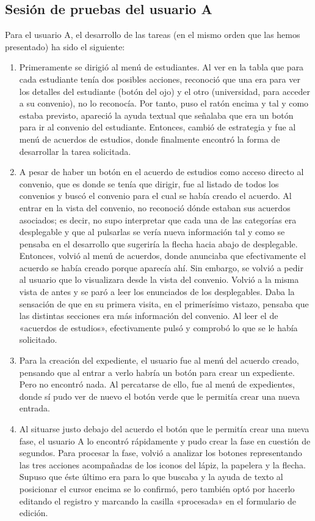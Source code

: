 \subsection{Sesión de pruebas del usuario A}

Para el usuario A, el desarrollo de las tareas (en el mismo orden que las hemos presentado) ha sido el siguiente:

\begin{enumerate}
	\item Primeramente se dirigió al menú de estudiantes. Al ver en la tabla que para cada estudiante tenía dos posibles acciones, reconoció que una era para ver los detalles del estudiante (botón del ojo) y el otro (universidad, para acceder a su convenio), no lo reconocía. Por tanto, puso el ratón encima y tal y como estaba previsto, apareció la ayuda textual que señalaba que era un botón para ir al convenio del estudiante. Entonces, cambió de estrategia y fue al menú de acuerdos de estudios, donde finalmente encontró la forma de desarrollar la tarea solicitada.
	\item A pesar de haber un botón en el acuerdo de estudios como acceso directo al convenio, que es donde se tenía que dirigir, fue al listado de todos los convenios y buscó el convenio para el cual se había creado el acuerdo. Al entrar en la vista del convenio, no reconoció dónde estaban sus acuerdos asociados; es decir, no supo interpretar que cada una de las categorías era desplegable y que al pulsarlas se vería nueva información tal y como se pensaba en el desarrollo que sugeriría la flecha hacia abajo de desplegable. Entonces, volvió al menú de acuerdos, donde anunciaba que efectivamente el acuerdo se había creado porque aparecía ahí. Sin embargo, se volvió a pedir al usuario que lo visualizara desde la vista del convenio. Volvió a la misma vista de antes y se paró a leer los enunciados de los desplegables. Daba la sensación de que en su primera visita, en el primerísimo vistazo, pensaba que las distintas secciones era más información del convenio. Al leer el de «acuerdos de estudios», efectivamente pulsó y comprobó lo que se le había solicitado.
	\item Para la creación del expediente, el usuario fue al menú del acuerdo creado, pensando que al entrar a verlo habría un botón para crear un expediente. Pero no encontró nada. Al percatarse de ello, fue al menú de expedientes, donde sí pudo ver de nuevo el botón verde que le permitía crear una nueva entrada.
	\item Al situarse justo debajo del acuerdo el botón que le permitía crear una nueva fase, el usuario A lo encontró rápidamente y pudo crear la fase en cuestión de segundos. Para procesar la fase, volvió a analizar los botones representando las tres acciones acompañadas de los iconos del lápiz, la papelera y la flecha. Supuso que éste último era para lo que buscaba y la ayuda de texto al posicionar el cursor encima se lo confirmó, pero también optó por hacerlo editando el registro y marcando la casilla «procesada» en el formulario de edición.

\end{enumerate}
